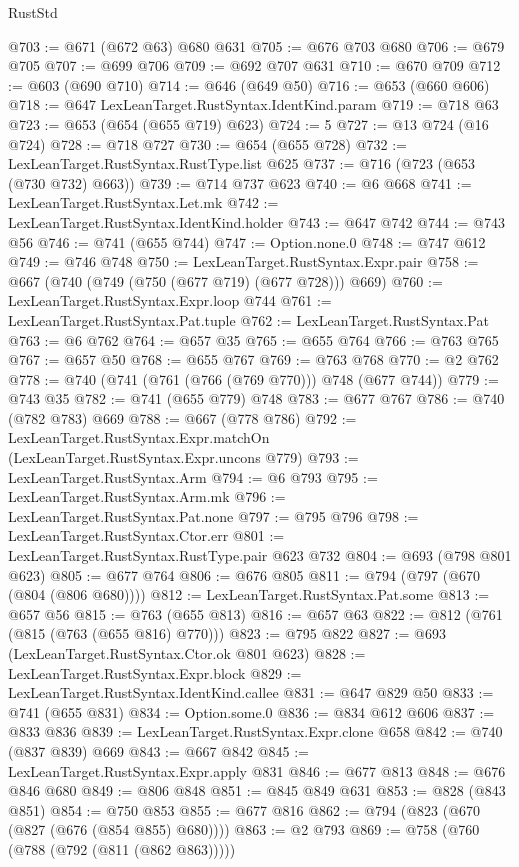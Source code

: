 \begin{lexlean}{RustStd}
\begin{coremodule}
@703 := @671 (@672 @63) @680 @631
@705 := @676 @703 @680
@706 := @679 @705
@707 := @699 @706
@709 := @692 @707 @631
@710 := @670 @709
@712 := @603 (@690 @710)
@714 := @646 (@649 @50)
@716 := @653 (@660 @606)
@718 := @647 LexLeanTarget.RustSyntax.IdentKind.param
@719 := @718 @63
@723 := @653 (@654 (@655 @719) @623)
@724 := 5
@727 := @13 @724 (@16 @724)
@728 := @718 @727
@730 := @654 (@655 @728)
@732 := LexLeanTarget.RustSyntax.RustType.list @625
@737 := @716 (@723 (@653 (@730 @732) @663))
@739 := @714 @737 @623
@740 := @6 @668
@741 := LexLeanTarget.RustSyntax.Let.mk
@742 := LexLeanTarget.RustSyntax.IdentKind.holder
@743 := @647 @742
@744 := @743 @56
@746 := @741 (@655 @744)
@747 := Option.none.{0}
@748 := @747 @612
@749 := @746 @748
@750 := LexLeanTarget.RustSyntax.Expr.pair
@758 := @667 (@740 (@749 (@750 (@677 @719) (@677 @728))) @669)
@760 := LexLeanTarget.RustSyntax.Expr.loop @744
@761 := LexLeanTarget.RustSyntax.Pat.tuple
@762 := LexLeanTarget.RustSyntax.Pat
@763 := @6 @762
@764 := @657 @35
@765 := @655 @764
@766 := @763 @765
@767 := @657 @50
@768 := @655 @767
@769 := @763 @768
@770 := @2 @762
@778 := @740 (@741 (@761 (@766 (@769 @770))) @748 (@677 @744))
@779 := @743 @35
@782 := @741 (@655 @779) @748
@783 := @677 @767
@786 := @740 (@782 @783) @669
@788 := @667 (@778 @786)
@792 := LexLeanTarget.RustSyntax.Expr.matchOn (LexLeanTarget.RustSyntax.Expr.uncons @779)
@793 := LexLeanTarget.RustSyntax.Arm
@794 := @6 @793
@795 := LexLeanTarget.RustSyntax.Arm.mk
@796 := LexLeanTarget.RustSyntax.Pat.none
@797 := @795 @796
@798 := LexLeanTarget.RustSyntax.Ctor.err
@801 := LexLeanTarget.RustSyntax.RustType.pair @623 @732
@804 := @693 (@798 @801 @623)
@805 := @677 @764
@806 := @676 @805
@811 := @794 (@797 (@670 (@804 (@806 @680))))
@812 := LexLeanTarget.RustSyntax.Pat.some
@813 := @657 @56
@815 := @763 (@655 @813)
@816 := @657 @63
@822 := @812 (@761 (@815 (@763 (@655 @816) @770)))
@823 := @795 @822
@827 := @693 (LexLeanTarget.RustSyntax.Ctor.ok @801 @623)
@828 := LexLeanTarget.RustSyntax.Expr.block
@829 := LexLeanTarget.RustSyntax.IdentKind.callee
@831 := @647 @829 @50
@833 := @741 (@655 @831)
@834 := Option.some.{0}
@836 := @834 @612 @606
@837 := @833 @836
@839 := LexLeanTarget.RustSyntax.Expr.clone @658
@842 := @740 (@837 @839) @669
@843 := @667 @842
@845 := LexLeanTarget.RustSyntax.Expr.apply @831
@846 := @677 @813
@848 := @676 @846 @680
@849 := @806 @848
@851 := @845 @849 @631
@853 := @828 (@843 @851)
@854 := @750 @853
@855 := @677 @816
@862 := @794 (@823 (@670 (@827 (@676 (@854 @855) @680))))
@863 := @2 @793
@869 := @758 (@760 (@788 (@792 (@811 (@862 @863)))))

\end{coremodule}
\end{lexlean}
